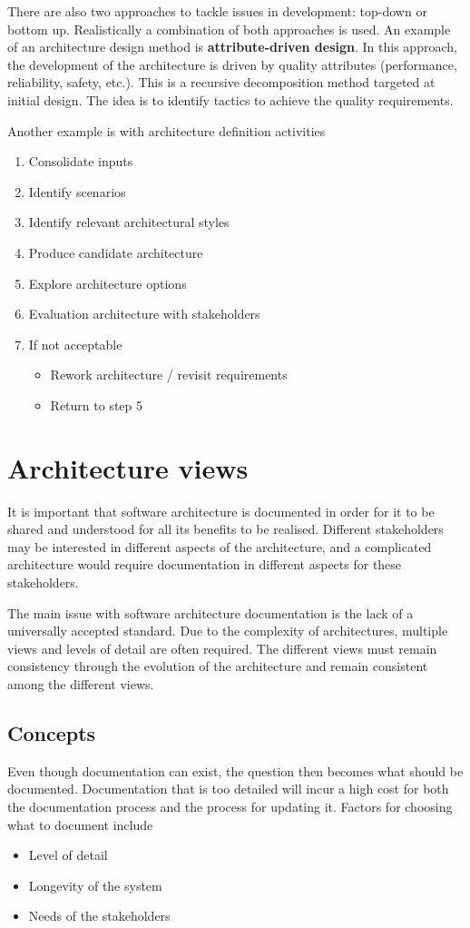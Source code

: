 \documentclass{sty/SizheArticle}
\begin{document}
There are also two approaches to tackle issues in development:
top-down or bottom up. Realistically a combination of both
approaches is used. An example of an architecture design method
is \textbf{attribute-driven design}. In this approach, the development
of the architecture is driven by quality attributes (performance,
reliability, safety, etc.). This is a recursive decomposition
method targeted at initial design. The idea is to identify tactics to
achieve the quality requirements.

Another example is with architecture definition activities
\begin{enumerate}
\item Consolidate inputs
\item Identify scenarios
\item Identify relevant architectural styles
\item Produce candidate architecture
\item Explore architecture options
\item Evaluation architecture with stakeholders
\item If not acceptable
  \begin{itemize}
  \item Rework architecture / revisit requirements
  \item Return to step 5
  \end{itemize}
\end{enumerate}

\section{Architecture views}
It is important that software architecture is documented in order
for it to be shared and understood for all its benefits to be realised.
Different stakeholders may be interested in different aspects of the
architecture, and a complicated architecture would require documentation
in different aspects for these stakeholders.

The main issue with software architecture documentation is the lack
of a universally accepted standard. Due to the complexity of architectures,
multiple views and levels of detail are often required. The different views
must remain consistency through the evolution of the architecture and remain
consistent among the different views.

\subsection{Concepts}
Even though documentation can exist, the question then becomes what should
be documented. Documentation that is too detailed will incur a high cost
for both the documentation process and the process for updating
it. Factors for choosing what to document include
\begin{itemize}
\item Level of detail
\item Longevity of the system
\item Needs of the stakeholders
\end{itemize}
\end{document}
